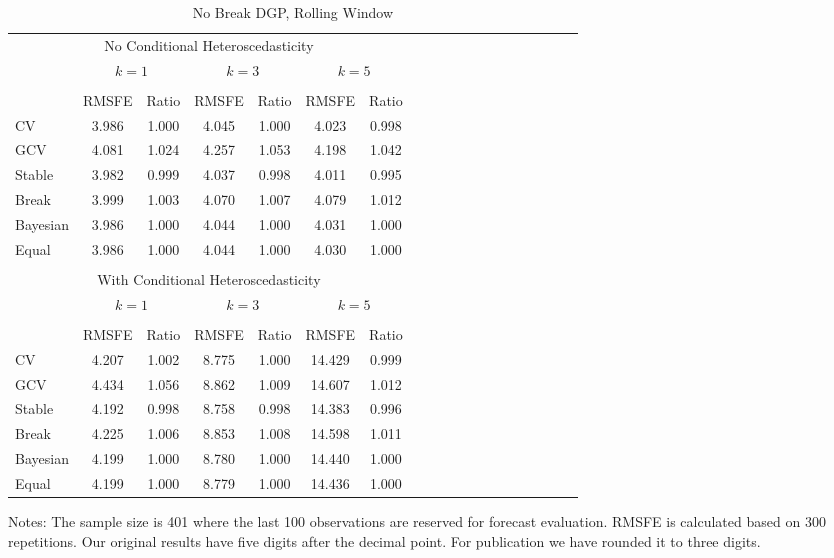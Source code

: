 \begin{sidewaystable}
\caption{No Break DGP, Rolling Window} \label{tb:5}
\centering
\begin{adjustbox}{scale=1,keepaspectratio}
\begin{threeparttable}
\begin{tabular}{lcccccccccccccccccc}
\toprule
\multicolumn{7}{c}{No Conditional Heteroscedasticity}\\[0.3em]
 & \multicolumn{2}{c}{$k = 1$} & \multicolumn{2}{c}{$k = 3$} & \multicolumn{2}{c}{$k = 5$} \\
\cmidrule(r){2-3}
\cmidrule(r){4-5}
\cmidrule(r){6-7} \\
         &RMSFE &Ratio &RMSFE &Ratio &RMSFE &Ratio \\
CV       &3.986 &1.000 &4.045 &1.000 &4.023 &0.998 \\
GCV      &4.081 &1.024 &4.257 &1.053 &4.198 &1.042 \\
Stable   &3.982 &0.999 &4.037 &0.998 &4.011 &0.995 \\
Break    &3.999 &1.003 &4.070 &1.007 &4.079 &1.012 \\
Bayesian &3.986 &1.000 &4.044 &1.000 &4.031 &1.000 \\
Equal    &3.986 &1.000 &4.044 &1.000 &4.030 &1.000 \\
\\[0.3em]
\multicolumn{7}{c}{With Conditional Heteroscedasticity}\\[0.3em]
 & \multicolumn{2}{c}{$k = 1$} & \multicolumn{2}{c}{$k = 3$} & \multicolumn{2}{c}{$k = 5$} \\
\cmidrule(r){2-3}
\cmidrule(r){4-5}
\cmidrule(r){6-7} \\
         &RMSFE &Ratio &RMSFE &Ratio &RMSFE &Ratio \\
CV       &4.207 &1.002 &8.775 &1.000 &14.429 &0.999 \\
GCV      &4.434 &1.056 &8.862 &1.009 &14.607 &1.012 \\
Stable   &4.192 &0.998 &8.758 &0.998 &14.383 &0.996 \\
Break    &4.225 &1.006 &8.853 &1.008 &14.598 &1.011 \\
Bayesian &4.199 &1.000 &8.780 &1.000 &14.440 &1.000 \\
Equal    &4.199 &1.000 &8.779 &1.000 &14.436 &1.000 \\
\bottomrule
\end{tabular}
\begin{tablenotes} \footnotesize
Notes: The sample size is 401 where the last 100 observations are reserved for forecast evaluation. RMSFE is calculated based on 300 repetitions. Our original results have five digits after the decimal point. For publication we have rounded it to three digits.
\end{tablenotes}
\end{threeparttable}
\end{adjustbox}
\end{sidewaystable}
